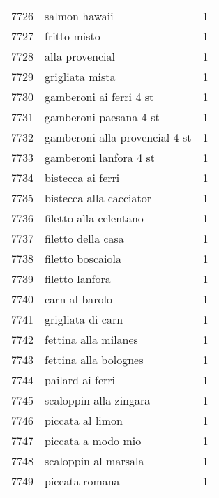 \begin{tabular}{llr}
7726 &                                      salmon hawaii &      1 \\
7727 &                                       fritto misto &      1 \\
7728 &                                    alla provencial &      1 \\
7729 &                                    grigliata mista &      1 \\
7730 &                            gamberoni ai ferri 4 st &      1 \\
7731 &                             gamberoni paesana 4 st &      1 \\
7732 &                     gamberoni alla provencial 4 st &      1 \\
7733 &                             gamberoni lanfora 4 st &      1 \\
7734 &                                  bistecca ai ferri &      1 \\
7735 &                            bistecca alla cacciator &      1 \\
7736 &                             filetto alla celentano &      1 \\
7737 &                                 filetto della casa &      1 \\
7738 &                                  filetto boscaiola &      1 \\
7739 &                                    filetto lanfora &      1 \\
7740 &                                     carn al barolo &      1 \\
7741 &                                  grigliata di carn &      1 \\
7742 &                               fettina alla milanes &      1 \\
7743 &                              fettina alla bolognes &      1 \\
7744 &                                   pailard ai ferri &      1 \\
7745 &                             scaloppin alla zingara &      1 \\
7746 &                                   piccata al limon &      1 \\
7747 &                                 piccata a modo mio &      1 \\
7748 &                               scaloppin al marsala &      1 \\
7749 &                                     piccata romana &      1 \\

\end{tabular}
